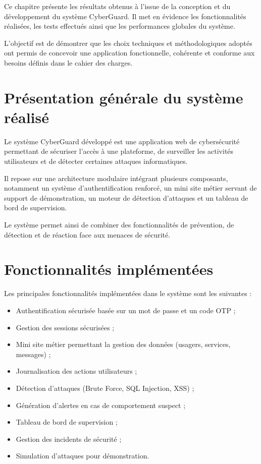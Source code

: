 \documentclass[a4paper,12pt]{report}
\begin{document}
    Ce chapitre présente les résultats obtenus à l’issue de la conception et du développement du système CyberGuard. Il met en évidence les fonctionnalités réalisées, les tests effectués ainsi que les performances globales du système.
    
    L’objectif est de démontrer que les choix techniques et méthodologiques adoptés ont permis de concevoir une application fonctionnelle, cohérente et conforme aux besoins définis dans le cahier des charges.
    
    \section{Présentation générale du système réalisé}
    
    Le système CyberGuard développé est une application web de cybersécurité permettant de sécuriser l’accès à une plateforme, de surveiller les activités utilisateurs et de détecter certaines attaques informatiques.
    
    Il repose sur une architecture modulaire intégrant plusieurs composants, notamment un système d’authentification renforcé, un mini site métier servant de support de démonstration, un moteur de détection d’attaques et un tableau de bord de supervision.
    
    Le système permet ainsi de combiner des fonctionnalités de prévention, de détection et de réaction face aux menaces de sécurité.
    
    \section{Fonctionnalités implémentées}
    
    Les principales fonctionnalités implémentées dans le système sont les suivantes :
    
    \begin{itemize}
        \item Authentification sécurisée basée sur un mot de passe et un code OTP ;
        \item Gestion des sessions sécurisées ;
        \item Mini site métier permettant la gestion des données (usagers, services, messages) ;
        \item Journalisation des actions utilisateurs ;
        \item Détection d’attaques (Brute Force, SQL Injection, XSS) ;
        \item Génération d’alertes en cas de comportement suspect ;
        \item Tableau de bord de supervision ;
        \item Gestion des incidents de sécurité ;
        \item Simulation d’attaques pour démonstration.
    \end{itemize}
    
\end{document}
